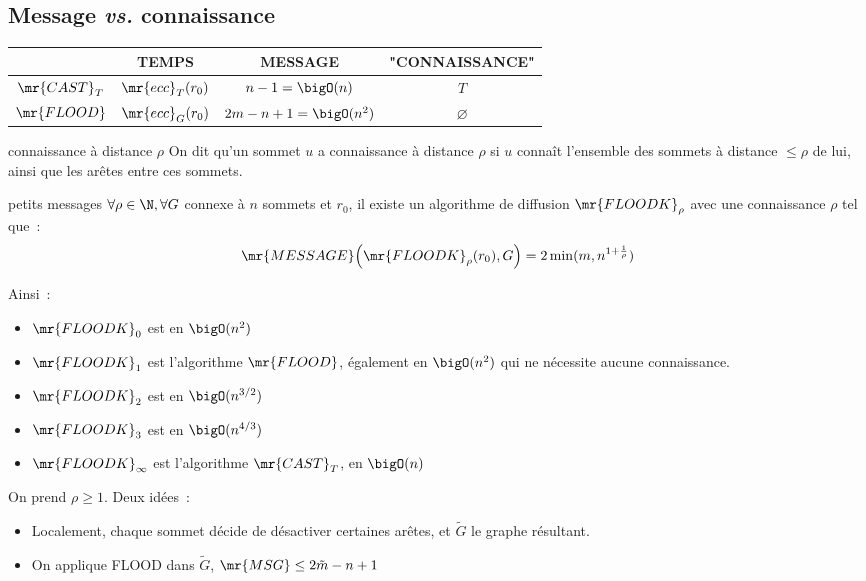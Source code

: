 \subsection{Message \textit{vs.} connaissance}

\begin{tabular}{c|c|c|c}
    & TEMPS & MESSAGE & "CONNAISSANCE" \\
    \hline
    $\mr{CAST}_T$ & $\mr{ecc}_T(r_0)$ & $n-1 = \bigO(n)$ & $T$ \\
    \hline
    $\mr{FLOOD}$ & $\mr{ecc}_G(r_0)$ & $2m-n+1 = \bigO(n^2)$ & $\varnothing$ \\
    \hline
\end{tabular}

\begin{definition}{}{connaissance à distance $\rho$}
  On dit qu'un sommet $u$ a connaissance à distance $\rho$ si $u$ connaît l'ensemble des sommets à distance $\leq \rho$ de lui, ainsi que les arêtes entre ces sommets.
\end{definition}

\begin{proposition}{}{petits messages}
  $\forall \rho \in \N, \forall G$ connexe à $n$ sommets et $r_0$, il existe un algorithme de diffusion $\mr{FLOODK}_\rho$ avec une connaissance $\rho$ tel que~:
  $$\mr{MESSAGE}\Big(\mr{FLOODK}_\rho(r_0), G\Big) = 2\min(m, n^{1 + \frac{1}{\rho}})$$
\end{proposition}


Ainsi~:
\begin{itemize}
  \item $\mr{FLOODK}_0$ est en $\bigO(n^2)$ 
  \item $\mr{FLOODK}_1$ est l'algorithme $\mr{FLOOD}$, également en $\bigO(n^2)$ qui ne nécessite aucune connaissance.
  \item $\mr{FLOODK}_2$ est en $\bigO(n^{3/2})$
  \item $\mr{FLOODK}_3$ est en $\bigO(n^{4/3})$
  \item $\mr{FLOODK}_\infty$ est l'algorithme $\mr{CAST}_T$, en $\bigO(n)$
\end{itemize}


\begin{demonstration}
  On prend $\rho \geq 1$. Deux idées~:
\begin{itemize}
  \item Localement, chaque sommet décide de désactiver certaines arêtes, et $\tilde{G}$ le graphe résultant.
  \item On applique FLOOD dans $\tilde{G}$, $\mr{MSG} \leq 2\tilde{m} - {n} + 1$
\end{itemize}
\end{demonstration}

